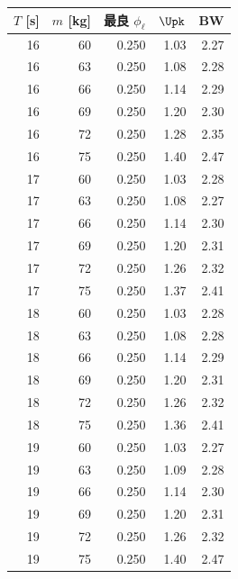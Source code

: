 \begin{tabular}{rrrrr}
\toprule
$T$ [s] & $m$ [kg] & 最良 $\phi_\ell$ & $\Upk$ & BW \\
\midrule
16 & 60 & 0.250 & 1.03 & 2.27 \\
16 & 63 & 0.250 & 1.08 & 2.28 \\
16 & 66 & 0.250 & 1.14 & 2.29 \\
16 & 69 & 0.250 & 1.20 & 2.30 \\
16 & 72 & 0.250 & 1.28 & 2.35 \\
16 & 75 & 0.250 & 1.40 & 2.47 \\
17 & 60 & 0.250 & 1.03 & 2.28 \\
17 & 63 & 0.250 & 1.08 & 2.27 \\
17 & 66 & 0.250 & 1.14 & 2.30 \\
17 & 69 & 0.250 & 1.20 & 2.31 \\
17 & 72 & 0.250 & 1.26 & 2.32 \\
17 & 75 & 0.250 & 1.37 & 2.41 \\
18 & 60 & 0.250 & 1.03 & 2.28 \\
18 & 63 & 0.250 & 1.08 & 2.28 \\
18 & 66 & 0.250 & 1.14 & 2.29 \\
18 & 69 & 0.250 & 1.20 & 2.31 \\
18 & 72 & 0.250 & 1.26 & 2.32 \\
18 & 75 & 0.250 & 1.36 & 2.41 \\
19 & 60 & 0.250 & 1.03 & 2.27 \\
19 & 63 & 0.250 & 1.09 & 2.28 \\
19 & 66 & 0.250 & 1.14 & 2.30 \\
19 & 69 & 0.250 & 1.20 & 2.31 \\
19 & 72 & 0.250 & 1.26 & 2.32 \\
19 & 75 & 0.250 & 1.40 & 2.47 \\
\bottomrule
\end{tabular}
